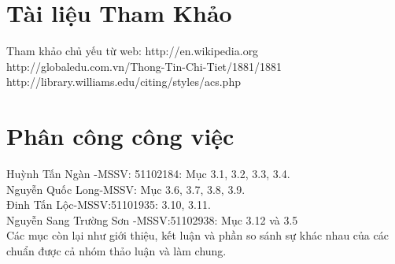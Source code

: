 \documentclass{hcmutarticle}
\begin{document}
\section{Tài liệu Tham Khảo }





Tham  khảo chủ yếu từ web: http://en.wikipedia.org\\
http://globaledu.com.vn/Thong-Tin-Chi-Tiet/1881/1881\\
http://library.williams.edu/citing/styles/acs.php\\

\newpage
\section{Phân công công việc}\label{conclusion}
Huỳnh Tấn Ngàn -MSSV: 51102184: Mục 3.1, 3.2, 3.3, 3.4.
\\Nguyễn Quốc Long-MSSV: Mục  3.6, 3.7, 3.8, 3.9.
\\Đinh Tấn Lộc-MSSV:51101935: 3.10, 3.11.
\\Nguyễn Sang Trường Sơn -MSSV:51102938: Mục 3.12 và 3.5
\\Các mục còn lại như giới thiệu, kết luận và phần so sánh sự khác nhau của các chuẩn được cả nhóm thảo luận và làm chung.
\end{document}

